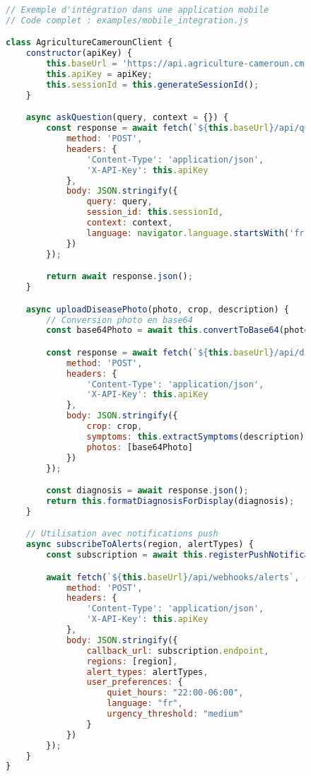 \begin{figure}[h]
\centering
\begin{lstlisting}[language=JavaScript, caption=Intégration JavaScript de l'API]
// Exemple d'intégration dans une application mobile
// Code complet : examples/mobile_integration.js

class AgricultureCamerounClient {
    constructor(apiKey) {
        this.baseUrl = 'https://api.agriculture-cameroun.cm';
        this.apiKey = apiKey;
        this.sessionId = this.generateSessionId();
    }

    async askQuestion(query, context = {}) {
        const response = await fetch(`${this.baseUrl}/api/query`, {
            method: 'POST',
            headers: {
                'Content-Type': 'application/json',
                'X-API-Key': this.apiKey
            },
            body: JSON.stringify({
                query: query,
                session_id: this.sessionId,
                context: context,
                language: navigator.language.startsWith('fr') ? 'fr' : 'en'
            })
        });

        return await response.json();
    }

    async uploadDiseasePhoto(photo, crop, description) {
        // Conversion photo en base64
        const base64Photo = await this.convertToBase64(photo);

        const response = await fetch(`${this.baseUrl}/api/diagnose`, {
            method: 'POST',
            headers: {
                'Content-Type': 'application/json',
                'X-API-Key': this.apiKey
            },
            body: JSON.stringify({
                crop: crop,
                symptoms: this.extractSymptoms(description),
                photos: [base64Photo]
            })
        });

        const diagnosis = await response.json();
        return this.formatDiagnosisForDisplay(diagnosis);
    }

    // Utilisation avec notifications push
    async subscribeToAlerts(region, alertTypes) {
        const subscription = await this.registerPushNotifications();

        await fetch(`${this.baseUrl}/api/webhooks/alerts`, {
            method: 'POST',
            headers: {
                'Content-Type': 'application/json',
                'X-API-Key': this.apiKey
            },
            body: JSON.stringify({
                callback_url: subscription.endpoint,
                regions: [region],
                alert_types: alertTypes,
                user_preferences: {
                    quiet_hours: "22:00-06:00",
                    language: "fr",
                    urgency_threshold: "medium"
                }
            })
        });
    }
}


\end{lstlisting}
\end{figure}
